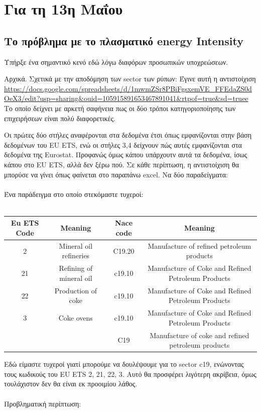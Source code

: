 \documentclass[a4paper,twoside,10pt]{article}
\begin{document}
\newpage


\section{Για τη 13η Μαΐου}
\subsection{Το πρόβλημα με το πλασματικό energy Intensity}
Υπήρξε ένα σημαντικό κενό εδώ λόγω διαφόρων προσωπικών υποχρεώσεων. 

Αρχικά. Σχετικά με την αποδόμηση των sector των ρύπων: Έγινε αυτή η αντιστοίχιση \url{https://docs.google.com/spreadsheets/d/1mwmZSr8PBiFgsxemVE_FFEdaZS0dOeX3/edit?usp=sharing&ouid=105915891653467891041&rtpof=true&sd=truee} Το οποίο δείχνει με αρκετή σαφήνεια πως οι δύο τρόποι κατηγοριοποίησης των επιχειρήσεων είναι πολύ διαφορετικές. 

Οι πρώτες δύο στήλες αναφέρονται στα δεδομένα έτσι όπως εμφανίζονται στην βάση δεδομένων του EU ETS, ενώ οι στήλες 3,4 δείχνουν πώς αυτές εμφανίζονται στα δεδομένα της Eurostat. Προφανώς όμως κάπου υπάρχουτν αυτά τα δεδομένα, ίσως κάπου στο EU ETS, αλλά δεν ξέρω πού. Σε κάθε περίπτωση, η αντιστοίχιση θα μπορύσε να γίνει όπως φαίνεται στο παραπάνω excel. Να δύο παραδείγματα:
\\ \\
Ένα παράδειγμα στο οποίο στεκόμαστε τυχεροί:\\ \\

\begin{tabular}{|c|c|c|c|}
	\hline
	Eu ETS Code & Meaning  & Nace code &  Meaning\\
	\hline
	2 & Mineral oil refineries & C19.20 & Manufacture of refined petroleum products \\
	\hline
	21 & Refining of mineral oil & c19.10 & Manufacture of Coke and Refined Petroleum Products \\
	\hline
	22 & Production of coke & c19.10 & Manufacture of Coke and Refined Petroleum Products \\
	\hline
	3 & Coke ovens & c19.10 & Manufacture of Coke and Refined Petroleum Products \\
	\hline
	&  & C19 & Manufacture of coke and refined petroleum products \\
	\hline
\end{tabular}
Εδώ είμαστε τυχεροί γιατί μπορούμε να δουλέψουμε για το sector c19, ενώνοντας τους κωδικούς του EU ETS 2, 21, 22, 3. Αυτό θα προσφέρει λιγότερη ακρίβεια, όμως τουλάχιστον δεν θα είναι εκ προοιμίου λάθος.
\\ \\
Προβληματική περίπτωση:
\\ \\
\end{document}

